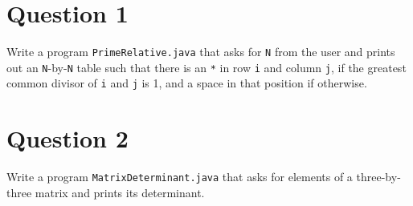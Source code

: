 \section*{Question 1}
Write a program \texttt{PrimeRelative.java} that asks for \texttt{N} from the user and prints out an \texttt{N}-by-\texttt{N} table such that there is an \texttt{*} in row \texttt{i} and column \texttt{j}, if the greatest common divisor of \texttt{i} and \texttt{j} is 1, and a space in that position if otherwise.

\section*{Question 2}
Write a program \texttt{MatrixDeterminant.java} that asks for elements of a three-by-three matrix and prints its determinant.